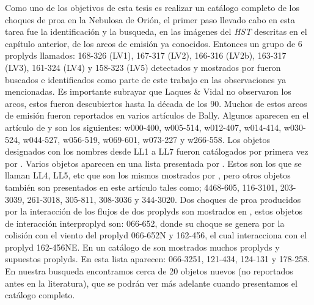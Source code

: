 %



%

\label{chap:methodology}
Como uno de los objetivos de esta tesis es realizar un catálogo completo de los choques de proa en la Nebulosa de Orión, el primer paso llevado cabo en esta tarea fue la identificación y la busqueda, en las imágenes del \textit{HST} descritas en el capítulo anterior, de los arcos de emisión ya conocidos. Entonces un grupo de 6 proplyds llamados: 168-326 (LV1), 167-317 (LV2), 166-316 (LV2b), 163-317 (LV3), 161-324 (LV4) y 158-323 (LV5) detectados y mostrados por  \citet{Laques:1979} fueron buscados e identificados como parte de este trabajo en las observaciones ya mencionadas. Es importante subrayar que Laques \& Vidal no observaron los arcos, estos fueron descubiertos hasta la década de los 90. Muchos de estos arcos de emisión fueron reportados en varios artículos de Bally. Algunos aparecen en el artículo de \citet{Bally:2000a} y son los siguientes: w000-400, w005-514, w012-407, w014-414, w030-524, w044-527, w056-519, w069-601, w073-227 y w266-558. Los objetos designados con los nombres desde LL1 a LL7 fueron catálogados por primera vez por \citet{Bally:2001a}. Varios objetos aparecen en una lista presentada por \citet{Bally:2006a}. Estos son los que se llaman LL4, LL5, etc que son los mismos mostrados por \citet{Bally:2001a}, pero otros objetos también son presentados en este artículo tales como; 4468-605, 116-3101, 203-3039, 261-3018, 305-811, 308-3036 y 344-3020. Dos choques de proa producidos por la interacción de los flujos de dos proplyds son mostrados en \citet{Reipurth:2007}, estos objetos de interacción interproplyd son: 066-652, donde su choque se genera por la colisión con el viento del proplyd 066-652N y 162-456, el cual interacciona con el proplyd 162-456NE. En un catálogo de \citet{Ricci:2008} son mostrados muchos proplyds y supuestos proplyds. En esta lista aparecen: 066-3251, 121-434, 124-131 y 178-258. En nuestra busqueda encontramos cerca de 20 objetos nuevos (no reportados antes en la literatura), que se podrán ver más adelante cuando presentamos el catálogo completo. \\         

